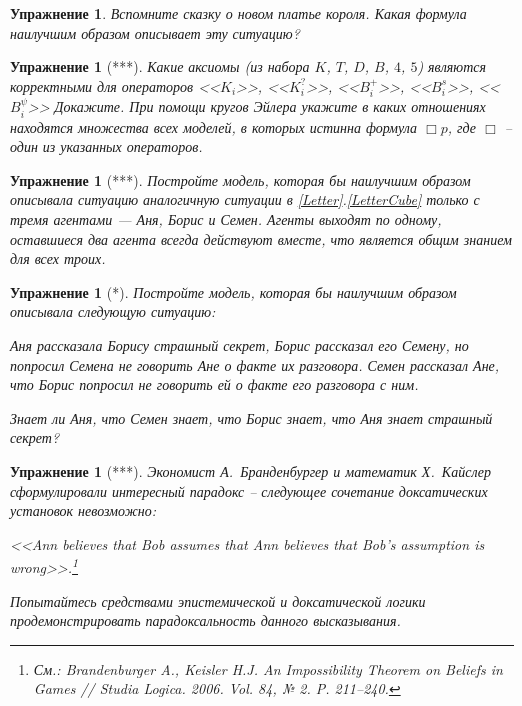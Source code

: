 \documentclass[11pt]{article}
\newtheorem{exercise}[theorem]{Упражнение}
\begin{document}
\begin{exercise} Вспомните сказку о новом платье короля. Какая формула наилучшим образом описывает эту ситуацию?
\end{exercise}

\begin{exercise}[***] Какие аксиомы (из набора $K$, $T$, $D$, $B$, $4$, $5$) являются корректными для операторов <<$K_i$>>, <<$K_i^?$>>, <<$B^{+}_i$>>, <<$B^s_i$>>, <<$B^{\psi}_i$>>  Докажите. При помощи кругов Эйлера укажите в каких отношениях находятся множества всех моделей, в которых истинна формула $\Box p$, где $\Box$ – один из указанных операторов.   
\end{exercise}

\begin{exercise}[***] Постройте модель, которая бы наилучшим образом описывала ситуацию аналогичную ситуации в \ref{Letter}.\ref{LetterCube} только с тремя агентами — Аня, Борис и Семен. Агенты выходят по одному, оставшиеся два агента всегда действуют вместе, что является общим знанием для всех троих.	
\end{exercise}


\begin{exercise}[*] Постройте модель, которая бы наилучшим образом описывала следующую ситуацию:

\begin{center}
 Аня рассказала Борису страшный секрет, Борис рассказал его Семену, но попросил Семена не говорить Ане о факте их разговора. Семен рассказал Ане, что Борис попросил не говорить ей о факте его разговора с ним.	
\end{center}

	Знает ли Аня, что Семен знает, что Борис знает, что Аня знает страшный секрет?
\end{exercise}


\begin{exercise}[***] Экономист А.~Бранденбургер и математик Х.~Кайслер сформулировали интересный парадокс – следующее сочетание доксатических установок невозможно:
\begin{center}
	<<Ann believes that Bob assumes that Ann believes that Bob’s assumption is wrong>>.\footnote{См.: \textit{Brandenburger A., Keisler H.J.} An Impossibility Theorem on Beliefs in Games // Studia Logica. 2006. Vol. 84, № 2. P. 211–240.}	
\end{center}
Попытайтесь средствами эпистемической и доксатической логики продемонстрировать парадоксальность данного высказывания.
\end{exercise}
\end{document}
